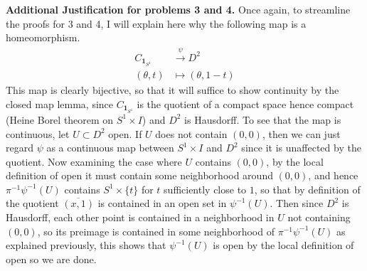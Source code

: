 \documentclass[10.5pt]{article}
\theoremstyle{definition}
\newcommand{\set}[1]{\{#1\}}
\begin{document}
    \textbf{Additional Justification for problems 3 and 4.} Once again, to streamline the proofs for 3 and 4, I will explain here why the following map is a homeomorphism.
    \begin{align*}
        C_{\mathbf{1}_{S^1}} &\overset{\psi}{\to} D^2 \\ 
        (\theta, t) &\mapsto (\theta, 1-t)
    \end{align*}
    This map is clearly bijective, so that it will suffice to show continuity by the closed map lemma, since 
    \(C_{\mathbf{1}_{S^1}}\) is the quotient of a compact space hence compact (Heine Borel theorem on \(S^1 \times I\))
    and \(D^2\) is Hausdorff. To see that the map is continuous, let \(U \subset D^2\) open.
    If \(U\) does not contain \((0,0)\), then we can just regard \(\psi\) as a continuous map between \(S^1 \times I\) and \(D^2\) since it is unaffected by the quotient. 
    Now examining the case where \(U\) contains \((0,0)\), by the local definition of open it must contain some neighborhood around \((0,0)\), and hence \(\pi^{-1}\psi^{-1}(U)\) contains
    \(S^1 \times \set{t}\) for \(t\) sufficiently close to \(1\), so that by definition of the quotient \(\overline{(x,1)}\) is contained in an open set in \(\psi^{-1}(U)\). Then since \(D^2\) is Hausdorff,
    each other point is contained in a neighborhood in \(U\) not containing \((0,0)\), so its preimage is contained in some neighborhood of \(\pi^{-1}\psi^{-1}(U)\) as explained previously, this shows that
    \(\psi^{-1}(U)\) is open by the local definition of open so we are done.
\end{document}
